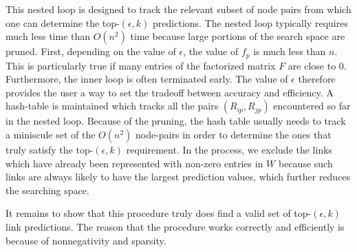 This nested loop is designed to track the relevant subset of node
pairs from which one can determine the top-$(\epsilon, k)$
predictions.  The nested loop typically requires much less time than
$O(n^2)$ time because large portions of the search space are pruned.
First, depending on the value of $\epsilon$, the value of $f_p$ is
much less than $n$.  This is particularly true if many entries of
the factorized matrix $F$ are close to 0.  Furthermore, the inner
loop is often terminated early. The value of $\epsilon$ therefore
provides the user a way to set the tradeoff between accuracy and
efficiency. A hash-table is maintained which tracks all the pairs
$(R_{ip}, R_{jp})$ encountered so far in the nested loop. Because of
the pruning, the hash table usually needs to track a miniscule set
of the $O(n^2)$ node-pairs in order to determine the ones that truly satisfy the top-$(\epsilon, k)$ requirement. In the process, we exclude
the links which have already been represented with non-zero entries in $W$
because such links are always likely to have the largest prediction values,
which further reduces the searching space.


 It remains to show that this procedure truly does find a valid set of  top-$(\epsilon,
k)$ link predictions. The reason that the procedure works correctly
and efficiently  is because of nonnegativity and sparsity.

